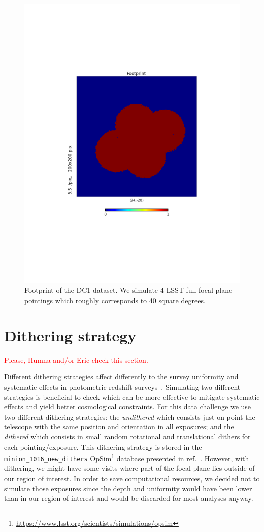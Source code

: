 \documentclass[\docopts]{\docclass}
\begin{document}
\begin{figure}
\centering
\includegraphics[trim={4cm, 6cm, 4cm, 6cm},clip,width=0.9\columnwidth]{footprint.pdf}
\caption{Footprint of the DC1 dataset. We simulate 4 LSST full focal plane pointings which roughly corresponds to 40 square degrees.}
\label{fig:footprint}
\end{figure}

\section{Dithering strategy}
\label{sec:dithering}
\textcolor{red}{Please, Humna and/or Eric check this section.}

Different dithering strategies affect differently to the survey uniformity and systematic effects in photometric redshift surveys~\citep{2016ApJ...829...50A}. Simulating two different strategies is beneficial to check which can be more effective to mitigate systematic effects and yield better cosmological constraints. For this data challenge we use two different dithering strategies: the \textit{undithered} which consists just on point the telescope with the same position and orientation in all exposures; and the \textit{dithered} which consists in small random rotational and translational dithers for each pointing/exposure. This dithering strategy is stored in the  \texttt{minion\_1016\_new\_dithers} OpSim\footnote{\url{https://www.lsst.org/scientists/simulations/opsim}} database presented in ref.~\citep{2016ApJ...829...50A}. However, with dithering, we might have some visits where part of the focal plane lies outside of our region of interest. In order to save computational resources, we decided not to simulate those exposures since the depth and uniformity would have been lower than in our region of interest and would be discarded for most analyses anyway.
\end{document}
